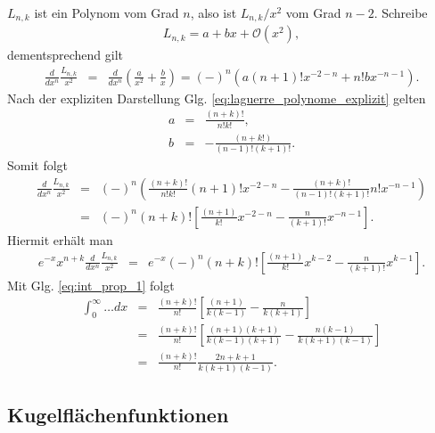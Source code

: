 \documentclass{book}
\begin{document}
%
$L_{n, k}$ ist ein Polynom vom Grad $n$, also ist $L_{n, k}/x^2$ vom Grad $n - 2$. Schreibe
%
\begin{eqnarray}
L_{n, k} = a + bx + \mathcal{O}\left(x^2\right), 
\end{eqnarray}
%
dementsprechend gilt
%
\begin{eqnarray}
\frac{d}{dx^n}\frac{L_{n, k}}{x^2} & = & \frac{d}{dx^n}\left(\frac{a}{x^2} + \frac{b}{x}\right) = \left(-\right)^n\left(a\left(n + 1\right)!x^{-2 - n} + n!bx^{-n - 1}\right).
\end{eqnarray}
%
Nach der expliziten Darstellung Glg. \eqref{eq:laguerre_polynome_explizit} gelten
%
\begin{eqnarray}
a & = & \frac{\left(n + k\right)!}{n!k!},\\
b & = & -\frac{\left(n + k!\right)}{\left(n - 1\right)!\left(k + 1\right)!}.
\end{eqnarray}
%
Somit folgt
%
\begin{eqnarray}
\frac{d}{dx^n}\frac{L_{n, k}}{x^2} & = & \left(-\right)^n\left(\frac{\left(n + k\right)!}{n!k!}\left(n + 1\right)!x^{-2 - n} - \frac{\left(n + k\right)!}{\left(n - 1\right)!\left(k + 1\right)!}n!x^{-n - 1}\right)\nonumber\\
& = & \left(-\right)^n\left(n + k\right)!\left[\frac{\left(n + 1\right)}{k!}x^{-2 - n} - \frac{n}{\left(k + 1\right)!}x^{-n - 1}\right].
\end{eqnarray}
%
Hiermit erhält man
%
\begin{eqnarray}
e^{-x}x^{n + k}\frac{d}{dx^n}\frac{L_{n, k}}{x^2} & = & e^{-x}\left(-\right)^n\left(n + k\right)!\left[\frac{\left(n + 1\right)}{k!}x^{k - 2} - \frac{n}{\left(k + 1\right)!}x^{k - 1}\right].
\end{eqnarray}
%
Mit Glg. \eqref{eq:int_prop_1} folgt
%
\begin{eqnarray}
\int_0^\infty\dotsc dx & = & \frac{\left(n + k\right)!}{n!}\left[\frac{\left(n + 1\right)}{k\left(k - 1\right)} - \frac{n}{k\left(k + 1\right)}\right]\nonumber\\
& = & \frac{\left(n + k\right)!}{n!}\left[\frac{\left(n + 1\right)\left(k + 1\right)}{k\left(k - 1\right)\left(k + 1\right)} - \frac{n\left(k - 1\right)}{k\left(k + 1\right)\left(k - 1\right)}\right]\nonumber\\
& = & \frac{\left(n + k\right)!}{n!}\frac{2n + k + 1}{k\left(k + 1\right)\left(k - 1\right)}.
\end{eqnarray}
%
\subsection{Kugelflächenfunktionen}
\label{sec:spherical_harmionen}
\end{document}
